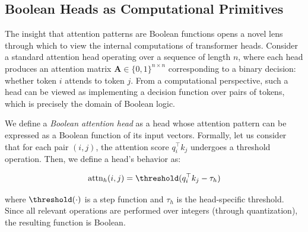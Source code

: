 \subsection{Boolean Heads as Computational Primitives}













The insight that attention patterns are Boolean functions opens a novel lens through which to view the internal computations of transformer heads. Consider a standard attention head operating over a sequence of length $n$, where each head produces an attention matrix $\mathbf{A} \in \{0, 1\}^{n \times n}$ corresponding to a binary decision: whether token $i$ attends to token $j$. From a computational perspective, such a head can be viewed as implementing a decision function over pairs of tokens, which is precisely the domain of Boolean logic.













We define a \emph{Boolean attention head} as a head whose attention pattern can be expressed as a Boolean function of its input vectors. Formally, let us consider that for each pair $(i,j)$, the attention score $q_i^\top k_j$ undergoes a threshold operation. Then, we define a head's behavior as:






$$






\text{attn}_{h}(i,j) = \threshold(q_i^\top k_j - \tau_h)






$$






where $\threshold(\cdot)$ is a step function and $\tau_h$ is the head-specific threshold. Since all relevant operations are performed over integers (through quantization), the resulting function is Boolean.













